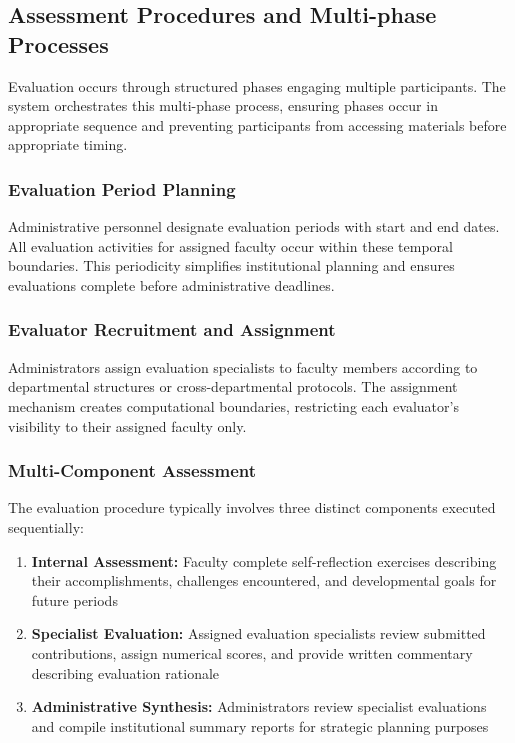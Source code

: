 \documentclass[conference]{IEEEtran}
\begin{document}
\subsection{Assessment Procedures and Multi-phase Processes}
\label{subsec:evaluation}

Evaluation occurs through structured phases engaging multiple participants. The system orchestrates this multi-phase process, ensuring phases occur in appropriate sequence and preventing participants from accessing materials before appropriate timing.

\subsubsection{Evaluation Period Planning}
Administrative personnel designate evaluation periods with start and end dates. All evaluation activities for assigned faculty occur within these temporal boundaries. This periodicity simplifies institutional planning and ensures evaluations complete before administrative deadlines.

\subsubsection{Evaluator Recruitment and Assignment}
Administrators assign evaluation specialists to faculty members according to departmental structures or cross-departmental protocols. The assignment mechanism creates computational boundaries, restricting each evaluator's visibility to their assigned faculty only.

\subsubsection{Multi-Component Assessment}
The evaluation procedure typically involves three distinct components executed sequentially:
\begin{enumerate}
\item \textbf{Internal Assessment:} Faculty complete self-reflection exercises describing their accomplishments, challenges encountered, and developmental goals for future periods
\item \textbf{Specialist Evaluation:} Assigned evaluation specialists review submitted contributions, assign numerical scores, and provide written commentary describing evaluation rationale
\item \textbf{Administrative Synthesis:} Administrators review specialist evaluations and compile institutional summary reports for strategic planning purposes
\end{enumerate}
\end{document}
